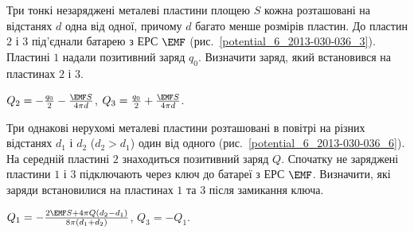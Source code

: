 \begin{problem}\label{prb:potential_6_2013-030-036_3}
    Три тонкі незаряджені металеві пластини площею $S$ кожна розташовані на відстанях $d$ одна від одної, причому $d$ багато менше розмірів пластин. До пластин $2$ і $3$ під'єднали батарею з ЕРС $\EMF$ (рис.~\ref{potential_6_2013-030-036_3}). Пластині $1$ надали позитивний заряд $q_0$. Визначити заряд, який встановився на пластинах $2$ і $3$.
\begin{solution}
	$Q_2 = -\frac{q_0}{2} -\frac{\EMF S}{4\pi d}$, $Q_3 = \frac{q_0}{2} + \frac{\EMF S}{4\pi d}$.
\end{solution}
\end{problem}

\begin{problem}\label{prb:potential_6_2013-030-036_6}
    Три однакові нерухомі металеві пластини розташовані в повітрі на різних відстанях $d_1$ і $d_2$ ($d_2> d_1$) один від одного (рис.~\ref{potential_6_2013-030-036_6}). На середній пластині $2$ знаходиться позитивний заряд $Q$. Спочатку не заряджені пластини $1$ і $3$ підключають через ключ до батареї з ЕРС $\EMF$. Визначити, які заряди встановилися на пластинах $1$ та $3$ після замикання ключа.
\begin{solution}
	$Q_1 = -\frac{2\EMF S + 4\pi Q(d_2 - d_1)}{8\pi(d_1 + d_2)}$, $Q_3 = -Q_1$.
\end{solution}
\end{problem}
